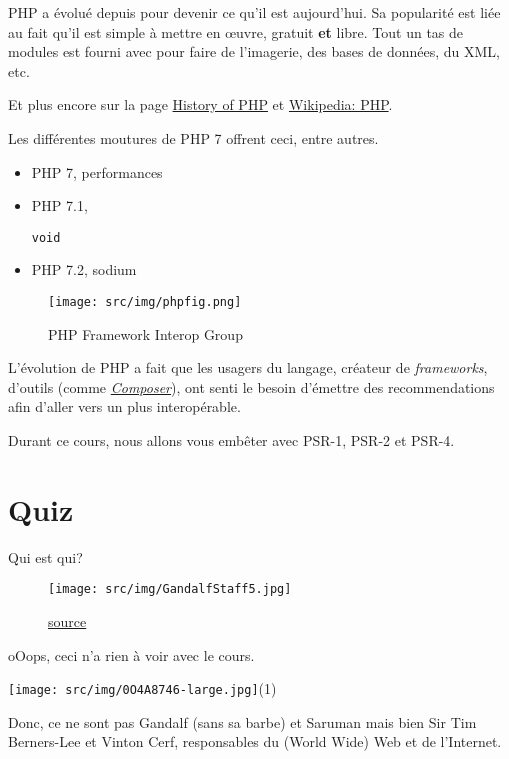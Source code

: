 PHP a évolué depuis pour devenir ce qu'il est aujourd'hui. Sa popularité
est liée au fait qu'il est simple à mettre en œuvre, gratuit \textbf{et}
libre. Tout un tas de modules est fourni avec pour faire de l'imagerie,
des bases de données, du XML, etc.

Et plus encore sur la page
\href{http://php.net/manual/en/history.php.php}{History of PHP} et
\href{https://en.wikipedia.org/wiki/PHP}{Wikipedia: PHP}.

Les différentes moutures de PHP 7 offrent ceci, entre autres.

\begin{itemize}
\tightlist
\item
  PHP 7, performances
\item
  PHP 7.1,
  \begin{otherlanguage}{english}\texttt{void}\end{otherlanguage}
\item
  PHP 7.2, sodium
\end{itemize}

\begin{figure}
\centering
\texttt{[image: src/img/phpfig.png]}
\caption{PHP Framework Interop Group}
\end{figure}

L'évolution de PHP a fait que les usagers du langage, créateur de
\emph{frameworks}, d'outils (comme
\href{http://getcomposer.org/}{\emph{Composer}}), ont senti le besoin
d'émettre des recommendations afin d'aller vers un plus interopérable.

Durant ce cours, nous allons vous embêter avec PSR-1, PSR-2 et PSR-4.

\hypertarget{quiz}{%
\section{Quiz}\label{quiz}}

Qui est qui?

\begin{figure}
\centering
\texttt{[image: src/img/GandalfStaff5.jpg]}
\caption{\href{http://hero.wikia.com/wiki/Gandalf}{source}}
\end{figure}

oOops, ceci n'a rien à voir avec le cours.

\texttt{[image: src/img/0O4A8746-large.jpg]}(1)

Donc, ce ne sont pas Gandalf (sans sa barbe) et Saruman mais bien Sir
Tim Berners-Lee et Vinton Cerf, responsables du (World Wide) Web et de
l'Internet.

